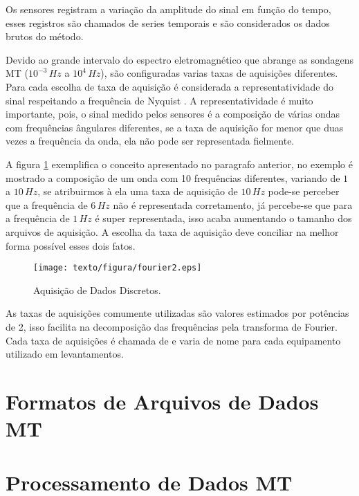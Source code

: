         Os sensores registram a variação da amplitude do sinal em função do tempo, esses registros são chamados de series temporais e são considerados os dados brutos do método. 
        
        Devido ao grande intervalo do espectro eletromagnético que abrange as sondagens MT ($10^{-3}\, Hz$ a $10^{4}\, Hz$), são configuradas varias taxas de aquisições diferentes. Para cada escolha de taxa de aquisição é considerada a representatividade do sinal respeitando a frequência de Nyquist \cite{nyquist28}. A representatividade é muito importante, pois, o sinal medido pelos sensores é a composição de várias ondas com frequências ângulares diferentes, se a taxa de aquisição for menor que duas vezes a frequência da onda, ela não pode ser representada fielmente.  
        
        A figura \ref{fig-aquisicao} exemplifica o conceito apresentado no paragrafo anterior, no exemplo é mostrado a composição de um onda com 10 frequências diferentes, variando de $1$ a $10\, Hz$, se atribuirmos à ela uma taxa de aquisição de $10\,Hz$ pode-se perceber que a frequência de $6\,Hz$ não é representada corretamento, já percebe-se que para a frequência de $1\,Hz$ é super representada, isso acaba aumentando o tamanho dos arquivos de aquisição. A escolha da taxa de aquisição deve conciliar na melhor forma possível esses dois fatos.
        
        \begin{figure}[H]
            \caption{Aquisição de Dados Discretos.}
                \begin{center}
                    \texttt{[image: texto/figura/fourier2.eps]}
                \end{center}
            \label{fig-aquisicao}
        \end{figure}
    
        As taxas de aquisições comumente utilizadas são valores estimados por potências de 2, isso facilita na decomposição das frequências pela transforma de Fourier. Cada taxa de aquisições é chamada de  e varia de nome para cada equipamento utilizado em levantamentos. 
    
    \section{Formatos de Arquivos de Dados MT}
    
    \section{Processamento de Dados MT}
    
